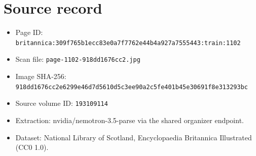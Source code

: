 \documentclass{article}
\begin{document}
\section*{Source record}
\begin{itemize}
\item Page ID: \texttt{britannica:309f765b1ecc83e0a7f7762e44b4a927a7555443:train:1102}
\item Scan file: \texttt{page-1102-918dd1676cc2.jpg}
\item Image SHA-256: \texttt{918dd1676cc2e6299e46d7d5610d5c3ee90a2c5fe401b45e30691f8e313293bc}
\item Source volume ID: \texttt{193109114}
\item Extraction: nvidia/nemotron-3.5-parse via the shared organizer endpoint.
\item Dataset: National Library of Scotland, Encyclopaedia Britannica Illustrated (CC0 1.0).
\end{itemize}
\end{document}
